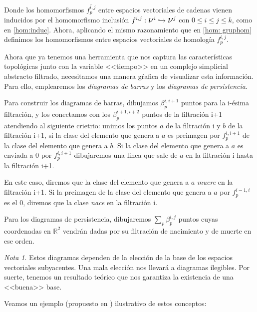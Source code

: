 \documentclass[12pt, a4paper, twoside]{book}
\numberwithin{equation}{section}
\theoremstyle{definition}
\theoremstyle{remark}
\newtheorem*{remark}{Nota}
\theoremstyle{plain}
\begin{document}
	Donde los homomorfismos $\overline{f_{p}^{i,j}}$ entre espacios 
	vectoriales de 
	cadenas vienen inducidos por el homomorfismo inclusión $f^{i,j}: 
	\text{{\Large $\nu$}$^{i}$} \xhookrightarrow{} 
	\text{{\Large $\nu$}$^{j}$}$ con $0\leq i \leq j \leq k$, como en 
	\ref{hom:induc}. Ahora, aplicando el mismo razonamiento que en 
	\ref{hom: gruphom} definimos los homomorfismos entre espacios 
	vectoriales de 
	homología $f^{i,j}_{p}$.

	Ahora que ya tenemos una herramienta que nos captura las 
	características topológicas junto con la variable <<tiempo>> en un 
	complejo simplicial abstracto filtrado, necesitamos una manera gŕafica 
	de visualizar esta información. Para ello, emplearemos los  
	\emph{diagramas de barras} y los \emph{diagramas de persistencia}.
	
	Para construir los diagramas de barras, dibujamos $\beta_{p}^{i,i+1}$ 
	puntos para la i-ésima filtración, y los conectamos con los 
	$\beta_{p}^{i+1,i+2}$ puntos de la filtración i+1 atendiendo al 
	siguiente crietrio: unimos los puntos $a$ de la filtración i y $b$ de
	la filtración i+1, si la clase del elemento que genera a $a$ es 
	preimagen por $f_{p}^{i,i+1}$ de la clase del elemento que genera a 
	$b$. Si la clase del elemento que genera a $a$ es enviada a 0 por 
	$f_{p}^{i,i+1}$ dibujaremos una linea que sale de $a$ en la filtración
	i hasta la filtración i+1. 

	En este caso, diremos que la clase del 
	elemento que genera a $a$ \emph{muere} en la filtración i+1. Si la 
	preimagen de la clase del elemento que genera a $a$ por 
	$f_{p}^{i-1,i}$ es el 0, diremos que la clase \emph{nace} en la 
	filtración i.

	Para los diagramas de persistencia, dibujaremos $\sum_{p}
	\beta_{p}^{i,j}$ puntos cuyas coordenadas en $\mathbb{R}^{2}$ vendrán 
	dadas por su filtración de nacimiento y de muerte en ese orden. 

	\begin{remark}
		Estos diagramas dependen de la elección de la base de los 
		espacios vectoriales subyacentes. Una mala elección nos 
		llevará a diagramas ilegibles. Por suerte, tenemos un 
		resultado teórico que nos garantiza la existencia de una 
		<<buena>> base.
	\end{remark}

	Veamos un ejemplo (propuesto en \cite{Intro-Otter}) ilustrativo de estos 
	conceptos:
\end{document}
